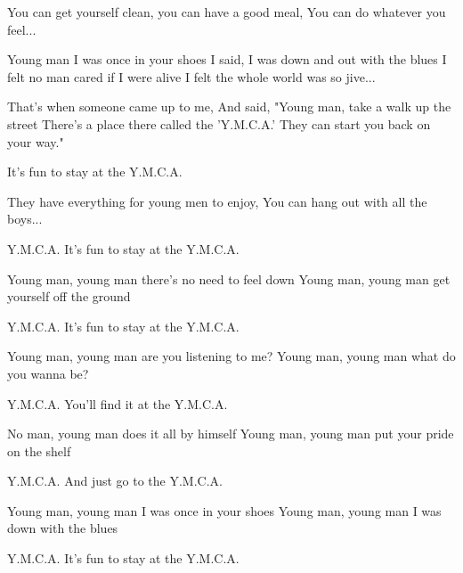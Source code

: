 \begin{verse*}
You can get yourself clean, you can have a good meal,
You can do whatever you feel...
\end{verse*}

\begin{verse*}
Young man
I was once in your shoes
I said, I was
down and out with the blues
I felt no man
cared if I were alive
I felt the whole world was so jive...
\end{verse*}

\begin{verse*}
That's when
someone came up to me,
And said, "Young man,
take a walk up the street
There's a place there
called the 'Y.M.C.A.'
They can start you back on your way."
\end{verse*}

\begin{verse*}
It's fun to stay at the Y.M.C.A. 
\end{verse*}

\begin{verse*}
They have everything for young men to enjoy,
You can hang out with all the boys...
\end{verse*}

\begin{verse*}
Y.M.C.A.
It's fun to stay at the Y.M.C.A.
\end{verse*}

\begin{verse*}
Young man, young man
there's no need to feel down
Young man, young man
get yourself off the ground
\end{verse*}

\begin{verse*}
Y.M.C.A.
It's fun to stay at the Y.M.C.A.
\end{verse*}

\begin{verse*}
Young man, young man
are you listening to me?
Young man, young man
what do you wanna be?
\end{verse*}

\begin{verse*}
Y.M.C.A.
You'll find it at the Y.M.C.A.
\end{verse*}

\begin{verse*}
No man, young man
does it all by himself
Young man, young man
put your pride on the shelf
\end{verse*}

\begin{verse*}
Y.M.C.A.
And just go to the Y.M.C.A.
\end{verse*}

\begin{verse*}
Young man, young man
I was once in your shoes
Young man, young man
I was down with the blues
\end{verse*}

\begin{verse*}
Y.M.C.A.
It's fun to stay at the Y.M.C.A.
\end{verse*}

